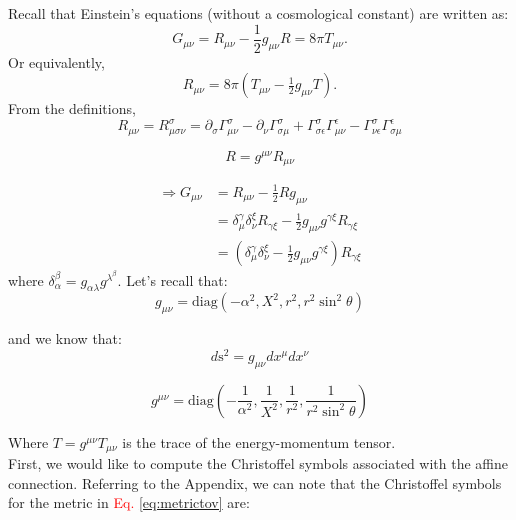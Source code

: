 \documentclass[12pt]{report}
\begin{document}
	Recall that Einstein’s equations (without a cosmological constant) are written as:
	\begin{equation}
		G_{\mu\nu} = R_{\mu\nu}-\dfrac{1}{2}g_{\mu\nu}R=8\pi T_{\mu\nu}.
	\end{equation}
	Or equivalently,
	\begin{equation}
		R_{\mu\nu} = 8\pi(T_{\mu\nu} - \tfrac{1}{2}g_{\mu\nu}T).
	\end{equation}
	From the definitions,
	\begin{equation}
		R_{\mu\nu} = R^{\sigma}_{\mu\sigma\nu} = \partial_{\sigma}\Gamma^{\sigma}_{\mu\nu} - \partial_{\nu}\Gamma^{\sigma}_{\sigma\mu} + \Gamma^{\sigma}_{\sigma\epsilon}\Gamma^{\epsilon}_{\mu\nu} - \Gamma^{\sigma}_{\nu\epsilon}\Gamma^{\epsilon}_{\sigma\mu}
	\end{equation}
	
	\begin{equation}R = g^{\mu\nu}R_{\mu\nu}\end{equation}
	
	\begin{align}
		\Rightarrow G_{\mu\nu} &= R_{\mu\nu} - \frac{1}{2}Rg_{\mu\nu} \\
		&=\delta^{\gamma}_{\mu}\delta^{\xi}_{\nu}R_{\gamma\xi} - \frac{1}{2}g_{\mu\nu}g^{\gamma\xi}R_{\gamma\xi}\\
		&= (\delta^{\gamma}_{\mu}\delta^{\xi}_{\nu} - \frac{1}{2}g_{\mu\nu}g^{\gamma\xi})R_{\gamma\xi}
	\end{align}
	where $\delta_\alpha^\beta=g_{\alpha\lambda}g^{\lambda^\beta}$. Let's recall that:
	\begin{equation}g_{\mu\nu} = \text{diag}(-\alpha^2, X^2, r^2, r^2\sin^2\theta)\end{equation}
	
	and we know that:
	\begin{equation} d\text{s}^2 = g_{\mu\nu}dx^{\mu}dx^{\nu}\end{equation}
	
	\begin{equation}
		g^{\mu\nu} = \text{diag}\left(-\frac{1}{\alpha^2}, \frac{1}{X^2}, \frac{1}{r^2}, \frac{1}{r^2\sin^2\theta}\right)
	\end{equation}
	
	Where $T = g^{\mu\nu}T_{\mu\nu}$ is the trace of the energy-momentum tensor.\\
	
	First, we would like to compute the Christoffel symbols associated with the affine connection. Referring to the Appendix, we can note that the Christoffel symbols for the metric in \textcolor{red}{Eq. \ref{eq:metrictov}} are:
	
\end{document}
